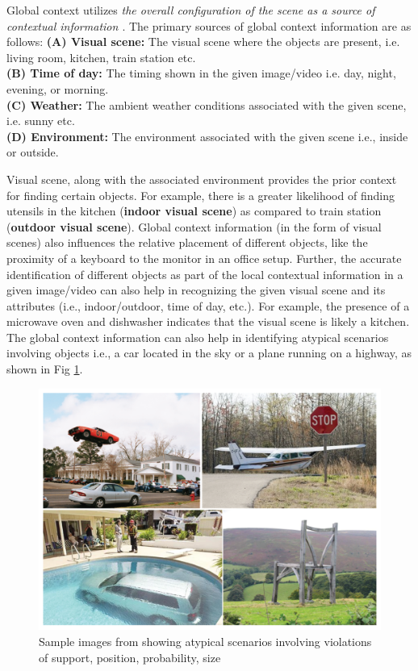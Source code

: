 Global context utilizes \textit{the overall configuration of the scene as a source of contextual information \cite{contextvision}}. The primary sources of global context information are as follows:
\textbf{(A) Visual scene:} The visual scene where the objects are present, i.e. living room, kitchen, train station etc. \\
\textbf{(B) Time of day:} The timing shown in the given image/video i.e. day, night, evening, or morning. \\
\textbf{ (C) Weather:} The ambient weather conditions associated with the given scene, i.e. sunny etc. \\
\textbf{ (D) Environment:} The environment associated with the given scene i.e., inside or outside.
\par 
Visual scene, along with the associated environment provides the prior context for finding certain objects. For example, there is a greater likelihood of finding utensils in the kitchen (\textbf{indoor visual scene}) as compared to train station (\textbf{outdoor visual scene}). Global context information (in the form of visual scenes) also influences the relative placement of different objects, like the proximity of a keyboard to the monitor in an office setup. Further, the accurate identification of different objects as part of the local contextual information in a given image/video can also help 
in recognizing the given visual scene \cite{Torralba2003ContextualPF} and its attributes (i.e., indoor/outdoor, time of day, etc.). For example, the presence of a microwave oven and dishwasher indicates that the visual scene is likely a kitchen. The global context information can also help in identifying atypical scenarios \cite{Choi2012ContextMA} involving objects i.e., a car located in the sky or a plane running on a highway, as shown in Fig \ref{outcontext}. 
\begin{figure}[h!]
    \centering
        \includegraphics[width=0.5\linewidth]{figures/out_of_context_image.png}
        \caption{Sample images from \cite{Choi2012ContextMA} showing atypical scenarios involving violations of support, position, probability, size }
        \label{outcontext}
\end{figure}
    
